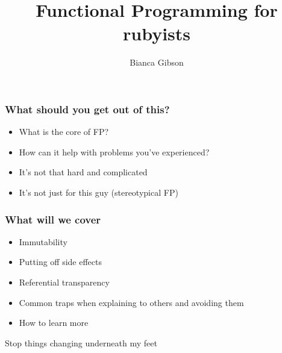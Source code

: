 \documentclass{beamer}
\title{Functional Programming for rubyists}
\author{Bianca Gibson}
\institute{Ruby Conf AU 2016}
\date{}
\begin{document}
\frame{\titlepage}

\begin{frame}
\frametitle{What should you get out of this?}
\begin{itemize}
\item What is the core of FP?
\item How can it help with problems you've experienced?
\item It's not that hard and complicated
\item It's not just for this guy (stereotypical FP)
\end{itemize}
\end{frame}

\begin{frame}
\frametitle{What will we cover}
\begin{itemize}
\item Immutability
\item Putting off side effects
\item Referential transparency
\item Common traps when explaining to others and avoiding them
\item How to learn more
\end{itemize}
\end{frame}

\begin{frame}
\begin{center}
\Huge Stop things changing underneath my feet
\end{center}
\end{frame}
\end{document}
